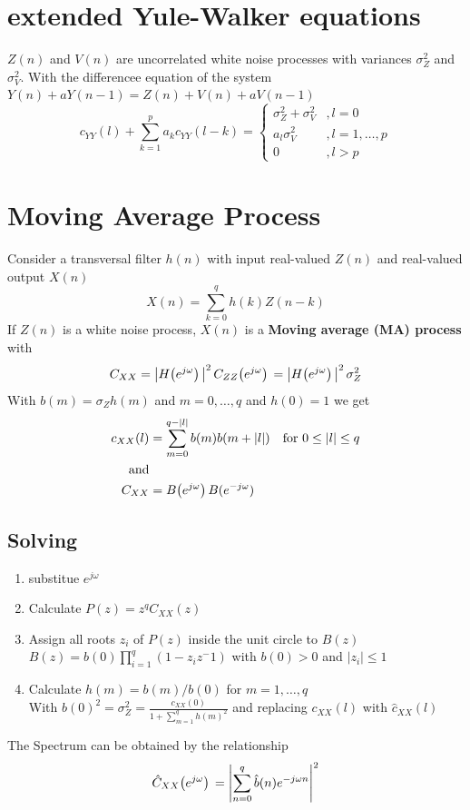 \documentclass[accentcolor=tud4c,9.5pt,nochapname,bigchapter,paper=a5report]{tudreport}
\begin{document}
\section{extended Yule-Walker equations}
$Z(n)$ and $V(n)$ are uncorrelated white noise processes with variances $\sigma^2_Z$ and $\sigma_V^2$. With the
differencee equation of the system $Y(n)+aY(n-1)=Z(n)+V(n)+aV(n-1)$
\begin{equation}
c_{YY}(l)+\sum\limits_{k=1}^p a_kc_{YY}(l-k) =\begin{cases}
\sigma_Z^2+\sigma_V^2 &,l=0 \\
a_l\sigma_V^2 &,l=1,\ldots,p\\
0 &,l>p
\end{cases}
\end{equation}

\section{Moving Average Process}
Consider a transversal filter $h(n)$ with input real-valued $Z(n)$ and real-valued output $X(n)$
\begin{equation}
X(n)=\sum\limits_{k=0}^q h(k)Z(n-k)
\end{equation} 
If $Z(n)$ is a white noise process, $X(n)$ is a {\bf Moving average (MA) process} with
\begin{equation}
C_{XX}=\left|H{\left(e^{j\omega}\right)}\,\right|^2C_{ZZ}{\left(e^{j\omega}\right)}\, =\left|H{\left(e^{j\omega}\right)}\,\right|^2\sigma_Z^2 
\end{equation}
With $b(m)=\sigma_Z h(m)$ and $m=0,\ldots,q$ and $h(0)=1$ we get
\begin{align}
c_{XX}(l)&=\sum\limits_{m=0}^{q-|l|} b(m)b(m+|l|) \quad \text{for } 0\leq |l| \leq q\\
\text{and}\\
C_{XX} &= B{\left(e^{j\omega}\right)}\, B(e^{-j\omega})
\end{align}
\subsection{Solving} \label{solv}
\begin{enumerate}
  \item substitue $e^{j\omega}$
  \item Calculate $P(z)=z^qC_{XX}(z)$
  \item Assign all roots $z_i$ of $P(z)$ inside the unit circle to $B(z)$ \\
  		$B(z)=b(0)\prod_{i=1}^q(1-z_iz^-1)$ with $b(0)>0$ and $|z_i|\leq 1$
  \item Calculate $h(m)=b(m)/b(0)$ for $m=1,\ldots,q$\\ 
		With $b(0)^2=\sigma_Z^2=\frac{c_{XX}(0)}{1+\sum_{m=1}^q h(m)^2}$ and replacing $c_{XX}(l)$ with $\hat{c}_{XX}(l)$ 
\end{enumerate}
The Spectrum can be obtained by the relationship
\begin{equation}
\hat{C}_{XX}{\left(e^{j\omega}\right)}\, = \left|\sum\limits_{n=0}^q \hat{b}(n)e^{-j\omega n} \right|^2
\end{equation}
\end{document}
